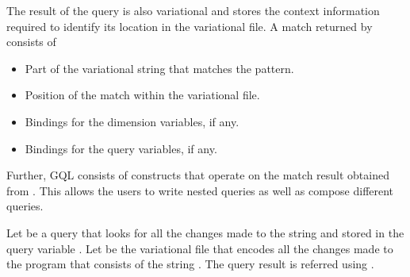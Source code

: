 The result of the query is also variational and stores the context information required to identify its location in the variational file. A match returned by  consists of
\begin{itemize}
\item Part of the variational string that matches the pattern.
\item Position of the match within the variational file.
\item Bindings for the dimension variables, if any.
\item Bindings for the query variables, if any.
\end{itemize}

Further, GQL consists of constructs that operate on the match result obtained from . This allows the users to write nested queries as well as compose different queries. 

Let  be a query that looks for all the changes made to the string  and stored in the query variable . Let  be the variational file that encodes all the changes made to the program that consists of the string . The query result is referred using . 

